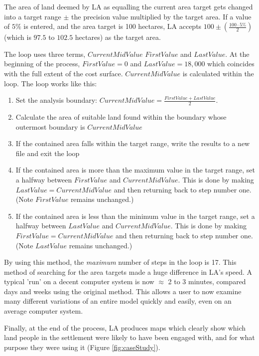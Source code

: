   The area of land deemed by LA as equalling the current area target gets
  changed into a target range $\pm$ the precision value multiplied by the 
  target area. If a value of $5\%$ is entered, and the area target is 100
  hectares, LA accepts $100 \pm(\frac{100 \cdot 5\%}{2})$ (which is $97.5$
  to $102.5$ hectares) as the target area.  
  
  The loop uses three terms, $CurrentMidValue$ $FirstValue$ and $LastValue$.
  At the beginning of the process, $FirstValue=0$ and $LastValue=18,000$
  which coincides with the full extent of the cost surface.  $CurrentMidValue$
  is calculated within the loop.  The loop works like this:

  \begin{enumerate} 
    \item Set the analysis boundary: $CurrentMidValue=\frac{FirstValue +
      LastValue}{2}$.  
    \item Calculate the area of suitable land found within the boundary whose
      outermost boundary is $CurrentMidValue$ 
    \item If the contained area falls within the target range, write the results
      to a new file and exit the loop 
    \item If the contained area is more than the maximum value in the target
      range, set a halfway between $FirstValue$ and $CurrentMidValue$. This is
      done by making $LastValue=CurrentMidValue$ and then returning back to step
      number one.  (Note $FirstValue$ remains unchanged.) 
    \item If the contained area is less than the minimum value in the target
      range, set a halfway between $LastValue$ and $CurrentMidValue$. This is
      done by making $FirstValue=CurrentMidValue$ and then returning back to step
      number one.  (Note $LastValue$ remains unchanged.) 
  \end{enumerate}

  By using this method, the \textit{maximum} number of steps in the loop is 17.
  This method of searching for the area targets made a huge difference in LA's
  speed.  A typical 'run' on a decent computer system is now $\approx$ 2 to 3
  minutes, compared days and weeks using the original method.  This allows a
  user to now examine many different variations of an entire model quickly and
  easily, even on an average computer system.
  
  Finally, at the end of the process, LA produces maps which clearly show
  which land people in the settlement were likely to have been engaged with, and
  for what purpose they were using it (Figure \ref{fig:caseStudy}).
 
